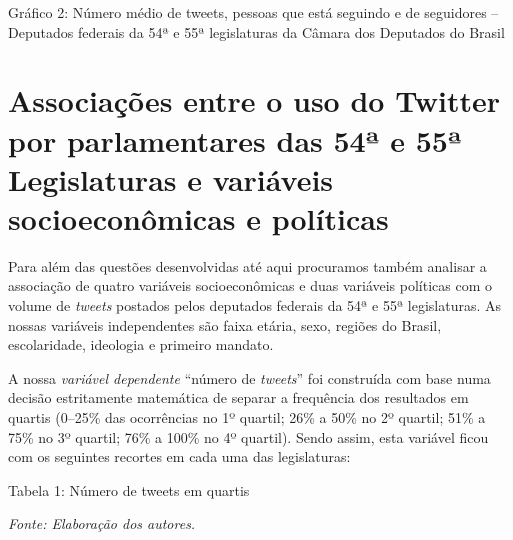 \begin{center}
Gráfico 2: Número médio de tweets, pessoas que está seguindo e de
seguidores -- Deputados federais da 54ª e 55ª legislaturas da Câmara dos
Deputados do Brasil
\end{center}


\section{Associações entre o uso do Twitter por parlamentares das 54ª
e 55ª Legislaturas e variáveis socioeconômicas e políticas}

Para além das questões desenvolvidas até aqui procuramos também analisar
a associação de quatro variáveis socioeconômicas e duas variáveis
políticas com o volume de \emph{tweets} postados pelos deputados
federais da 54ª e 55ª legislaturas. As nossas variáveis independentes
são faixa etária, sexo, regiões do Brasil, escolaridade, ideologia e
primeiro mandato.

A nossa \emph{variável dependente} ``número de \emph{tweets}'' foi
construída com base numa decisão estritamente matemática de separar a
frequência dos resultados em quartis (0--25\% das ocorrências no 1º
quartil; 26\% a 50\% no 2º quartil; 51\% a 75\% no 3º quartil; 76\% a
100\% no 4º quartil). Sendo assim, esta variável ficou com os seguintes
recortes em cada uma das legislaturas:

\begin{center}
Tabela 1: Número de tweets em quartis\bigskip

{\footnotesize\emph{Fonte: Elaboração dos autores.}}
\end{center}


